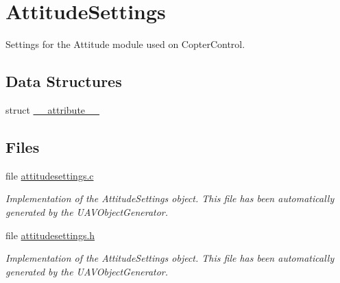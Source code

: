 \hypertarget{group___attitude_settings}{\section{\-Attitude\-Settings}
\label{group___attitude_settings}
}


\-Settings for the \-Attitude module used on \-Copter\-Control.  


\subsection*{\-Data \-Structures}
\begin{DoxyCompactItemize}
\item 
struct \hyperlink{struct____attribute____}{\-\_\-\-\_\-attribute\-\_\-\-\_\-}
\end{DoxyCompactItemize}
\subsection*{\-Files}
\begin{DoxyCompactItemize}
\item 
file \hyperlink{attitudesettings_8c}{attitudesettings.\-c}
\begin{DoxyCompactList}\small\item\em \-Implementation of the \-Attitude\-Settings object. \-This file has been automatically generated by the \-U\-A\-V\-Object\-Generator. \end{DoxyCompactList}\item 
file \hyperlink{attitudesettings_8h}{attitudesettings.\-h}
\begin{DoxyCompactList}\small\item\em \-Implementation of the \-Attitude\-Settings object. \-This file has been automatically generated by the \-U\-A\-V\-Object\-Generator. \end{DoxyCompactList}\end{DoxyCompactItemize}

